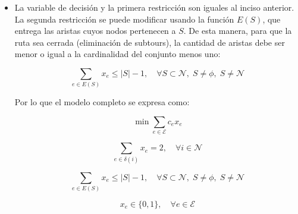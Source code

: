 \begin{itemize}
\textbf{Modelo completo}

\begin{equation}
\min \sum_{e \in \mathcal{E}} c_e x_e
\end{equation}

\begin{equation}
\sum_{e \in \delta(i)} x_e = 2, \quad \forall i \in S \neq \mathcal{N}
\end{equation}

\begin{equation}
\sum_{e \in \delta(S)} x_e \geq 2, \quad \forall  S \subset \mathcal{N},\; S \neq \phi,\; S \neq \mathcal{N}
\end{equation}

\begin{equation}
x_e \in \{0,1\}, \quad \forall e \in \mathcal{E}
\end{equation}

\item[(b)]
La variable de decisión y la primera restricción son iguales al inciso anterior. La segunda
restricción se puede modificar usando la función $E(S)$, que entrega las aristas cuyos nodos pertenecen a $S$. De esta manera, para que la ruta sea cerrada (eliminación de subtours), la cantidad de aristas
debe ser menor o igual a la cardinalidad del conjunto menos uno:

\begin{equation}
\sum_{e \in E(S)} x_e \leq |S| - 1, \quad \forall S \subset \mathcal{N},\; S \neq \phi,\; S \neq \mathcal{N}
\label{ex:2:6:eq:subtourtryhard}
\end{equation}

Por lo que el modelo completo se expresa como:

\begin{equation}
\min \sum_{e \in \mathcal{E}} c_e x_e
\end{equation}

\begin{equation}
\sum_{e \in \delta(i)} x_e = 2, \quad \forall i \in \mathcal{N}
\end{equation}

\begin{equation}
\sum_{e \in E(S)} x_e \leq |S| - 1, \quad \forall S \subset \mathcal{N},\; S \neq \phi,\; S \neq \mathcal{N}
\end{equation}

\begin{equation}
x_e \in \{0,1\}, \quad \forall e \in \mathcal{E}
\end{equation}


\end{itemize}
